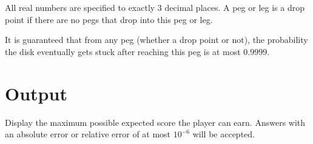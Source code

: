 All real numbers are specified to exactly 3 decimal places.
A peg or leg is a drop point if there are no pegs that drop into this peg or leg.

It is guaranteed that from any peg (whether a drop point or not),
the probability the disk eventually gets stuck after reaching this peg
is at most $0.9999$.

\section*{Output}
Display the maximum possible expected score the player can earn.
Answers with an absolute error or relative error of at most $10^{-6}$
will be accepted.
